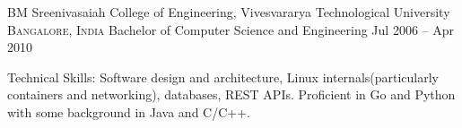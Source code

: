 \documentclass[10pt,a4paper]{article}
\begin{document}
\headedsection
{BM Sreenivasaiah College of Engineering, Vivesvararya Technological University}
{\textsc{Bangalore, India}} {%
	\headedsubsection
	{Bachelor of Computer Science and Engineering}
	{Jul 2006 -- Apr 2010}
	{
	}
}

\spacedhrule{1.6em}{-0.4em}


\inlineheadsection  %
{Technical Skills:}
{
  Software design and architecture, Linux internals(particularly containers and
  networking), databases, REST APIs. Proficient in Go and Python with some
  background in Java and C/C++.
}
\end{document}
